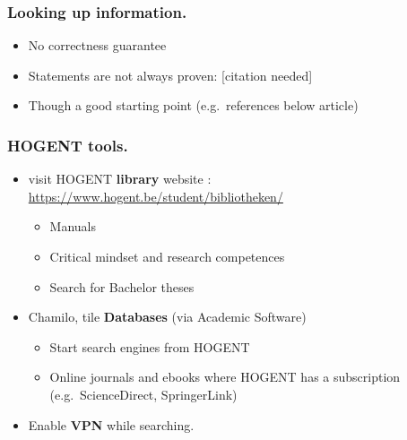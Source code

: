 \documentclass[aspectratio=169]{beamer}
\begin{document}
\begin{frame}
    \frametitle{Looking up information.}


    {\pause}

    \begin{itemize}
        \item No correctness guarantee
        \item Statements are not always proven: [citation needed]
        \item \alert{Though} a good starting point (e.g.\ references below article)
    \end{itemize}
\end{frame}

\begin{frame}
    \frametitle{HOGENT tools.}

    \begin{itemize}
        \item<+-> visit HOGENT \textbf{library} website : \url{https://www.hogent.be/student/bibliotheken/}
            \begin{itemize}
                \item Manuals
                \item Critical mindset and research competences
                \item Search for Bachelor theses
            \end{itemize}
        \item<+-> Chamilo, tile \textbf{Databases} (via Academic Software)
            \begin{itemize}
                \item Start search engines from HOGENT
                \item Online journals and ebooks where HOGENT has a subscription (e.g.~ScienceDirect, SpringerLink)
            \end{itemize}
        \item<+-> Enable \textbf{VPN} while searching.
    \end{itemize}
\end{frame}
\end{document}
